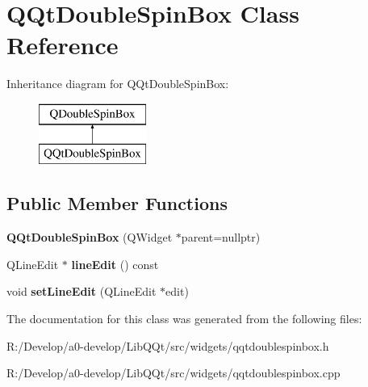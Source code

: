 \hypertarget{class_q_qt_double_spin_box}{}\section{Q\+Qt\+Double\+Spin\+Box Class Reference}
\label{class_q_qt_double_spin_box}
Inheritance diagram for Q\+Qt\+Double\+Spin\+Box\+:\begin{figure}[H]
\begin{center}
\leavevmode
\includegraphics[height=2.000000cm]{class_q_qt_double_spin_box}
\end{center}
\end{figure}
\subsection*{Public Member Functions}
\begin{DoxyCompactItemize}
\item 
\mbox{\label{class_q_qt_double_spin_box_a27ad458eb58644bd44fd617aaa9bfd40}} 
{\bfseries Q\+Qt\+Double\+Spin\+Box} (Q\+Widget $\ast$parent=nullptr)
\item 
\mbox{\label{class_q_qt_double_spin_box_aaf50622aecda1584aff6c20ec8629c9e}} 
Q\+Line\+Edit $\ast$ {\bfseries line\+Edit} () const
\item 
\mbox{\label{class_q_qt_double_spin_box_abad4a343abc585001e20e166463cd16e}} 
void {\bfseries set\+Line\+Edit} (Q\+Line\+Edit $\ast$edit)
\end{DoxyCompactItemize}


The documentation for this class was generated from the following files\+:\begin{DoxyCompactItemize}
\item 
R\+:/\+Develop/a0-\/develop/\+Lib\+Q\+Qt/src/widgets/qqtdoublespinbox.\+h\item 
R\+:/\+Develop/a0-\/develop/\+Lib\+Q\+Qt/src/widgets/qqtdoublespinbox.\+cpp\end{DoxyCompactItemize}
